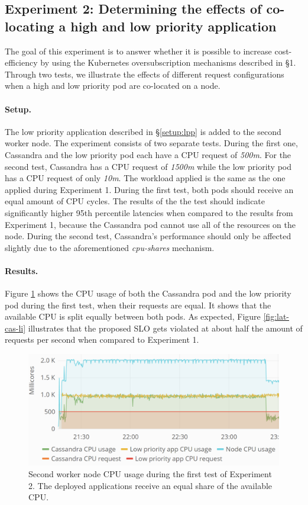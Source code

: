 \subsection{Experiment 2: Determining the effects of co-locating a high and low priority application}
The goal of this experiment is to answer whether it is possible to increase cost-efficiency by using the Kubernetes oversubscription mechanisms described in \S1. Through two tests, we illustrate the effects of different request configurations when a high and low priority pod are co-located on a node.

\paragraph{Setup.}
The low priority application described in \S\ref{setup:lpp} is added to the second worker node. The experiment consists of two separate tests. During the first one, Cassandra and the low priority pod each have a CPU request of \textit{500m}. For the second test, Cassandra has a CPU request of \textit{1500m} while the low priority pod has a CPU request of only \textit{10m}. The workload applied is the same as the one applied during Experiment 1. During the first test, both pods should receive an equal amount of CPU cycles. The results of the the test should indicate significantly higher 95th percentile latencies when compared to the results from Experiment 1, because the Cassandra pod cannot use all of the resources on the node. During the second test, Cassandra's performance should only be affected slightly due to the aforementioned \textit{cpu-shares} mechanism.

\paragraph{Results.}
Figure \ref{fig:cpu-cas-lpp-li} shows the CPU usage of both the Cassandra pod and the low priority pod during the first test, when their requests are equal. It shows that the available CPU is split equally between both pods. As expected, Figure \ref{fig:lat-cas-li} illustrates that the proposed  SLO gets violated at about half the amount of requests per second when compared to Experiment 1.

\begin{figure}
\centering
\includegraphics[width=0.90\columnwidth]{Images/Experiments/CPU/Grafana/cpu-cas-lpp-li.PNG}
\caption{Second worker node CPU usage during the first test of Experiment 2. The deployed applications receive an equal share of the available CPU.}
\label{fig:cpu-cas-lpp-li}
\end{figure}

